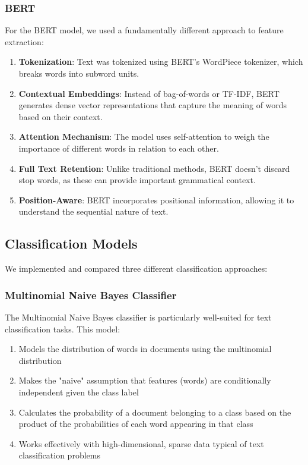 \documentclass[conference]{IEEEtran}
\begin{document}
\subsubsection{BERT}
For the BERT model, we used a fundamentally different approach to feature extraction:
\begin{enumerate}
\item \textbf{Tokenization}: Text was tokenized using BERT's WordPiece tokenizer, which breaks words into subword units.
\item \textbf{Contextual Embeddings}: Instead of bag-of-words or TF-IDF, BERT generates dense vector representations that capture the meaning of words based on their context.
\item \textbf{Attention Mechanism}: The model uses self-attention to weigh the importance of different words in relation to each other.
\item \textbf{Full Text Retention}: Unlike traditional methods, BERT doesn't discard stop words, as these can provide important grammatical context.
\item \textbf{Position-Aware}: BERT incorporates positional information, allowing it to understand the sequential nature of text.
\end{enumerate}

\subsection{Classification Models}
We implemented and compared three different classification approaches:

\subsubsection{Multinomial Naive Bayes Classifier}
The Multinomial Naive Bayes classifier is particularly well-suited for text classification tasks. This model:
\begin{enumerate}
\item Models the distribution of words in documents using the multinomial distribution
\item Makes the "naive" assumption that features (words) are conditionally independent given the class label
\item Calculates the probability of a document belonging to a class based on the product of the probabilities of each word appearing in that class
\item Works effectively with high-dimensional, sparse data typical of text classification problems
\end{enumerate}
\end{document}
